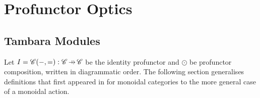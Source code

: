 \documentclass[11pt,a4paper]{article}
\makeatletter
\theoremstyle{plain}
\theoremstyle{definition}
\newcommand{\C}{\mathscr{C}}
\newcommand{\id}{\mathrm{id}}
\newcommand{\hto}{\ensuremath{\,\mathaccent\shortmid\rightarrow\,}}
\providecommand{\leftsquigarrow}{%
  \mathrel{\mathpalette\reflect@squig\relax}%
}
\newcommand{\reflect@squig}[2]{%
  \reflectbox{$\m@th#1\rightsquigarrow$}%
}
\newcommand{\todo}[1]{\textcolor{red}{\small #1}}
\makeatother
\begin{document}
%
%

\section{Profunctor Optics}

\subsection{Tambara Modules}
Let $I = \C(-,{=}) : \C \hto \C$ be the identity profunctor and $\odot$ be profunctor composition, written in diagrammatic order. The following section generalises definitions that first appeared in \cite[Section 3]{Doubles} for monoidal categories to the more general case of a monoidal action.
\end{document}
